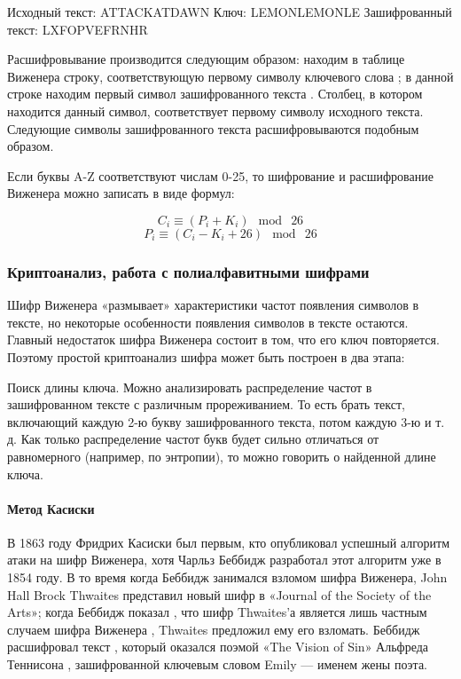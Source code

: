 Исходный текст:      ATTACKATDAWN
Ключ:                LEMONLEMONLE
Зашифрованный текст: LXFOPVEFRNHR

Расшифровывание производится следующим образом: находим в таблице 
Виженера строку, соответствующую первому символу ключевого слова
; в данной строке находим первый символ зашифрованного текста
. Столбец, в котором находится данный символ, соответствует первому 
символу исходного текста. Следующие символы зашифрованного текста 
расшифровываются подобным образом.

Если буквы A-Z соответствуют числам 0-25, то шифрование и расшифрование Виженера 
можно записать в виде формул:

    $$C_i \equiv (P_i + K_i) \mod\ 26$$
    $$P_i \equiv (C_i - K_i + 26) \mod\ 26$$

\subsubsection{Криптоанализ, работа с полиалфавитными шифрами}

Шифр Виженера «размывает» характеристики частот появления символов 
в тексте, но некоторые особенности появления символов в тексте 
остаются. Главный недостаток шифра Виженера состоит в том, что 
его ключ повторяется. Поэтому простой криптоанализ шифра может 
быть построен в два этапа:

Поиск длины ключа. Можно анализировать распределение частот в 
зашифрованном тексте с различным прореживанием. То есть брать 
текст, включающий каждую 2-ю букву зашифрованного текста, потом 
каждую 3-ю и т. д. Как только распределение частот букв будет 
сильно отличаться от равномерного (например, по энтропии), то 
можно говорить о найденной длине ключа.

\paragraph{Метод Касиски}

В 1863 году Фридрих Касиски был первым, кто опубликовал успешный 
алгоритм атаки на шифр Виженера, хотя Чарльз Беббидж разработал 
этот алгоритм уже в 1854 году. В то время когда Беббидж занимался 
взломом шифра Виженера, John Hall Brock Thwaites представил новый 
шифр в «Journal of the Society of the Arts»; когда Беббидж показал
, что шифр Thwaites’а является лишь частным случаем шифра Виженера
, Thwaites предложил ему его взломать. Беббидж расшифровал текст
, который оказался поэмой «The Vision of Sin» Альфреда Теннисона
, зашифрованной ключевым словом Emily — именем жены поэта.

